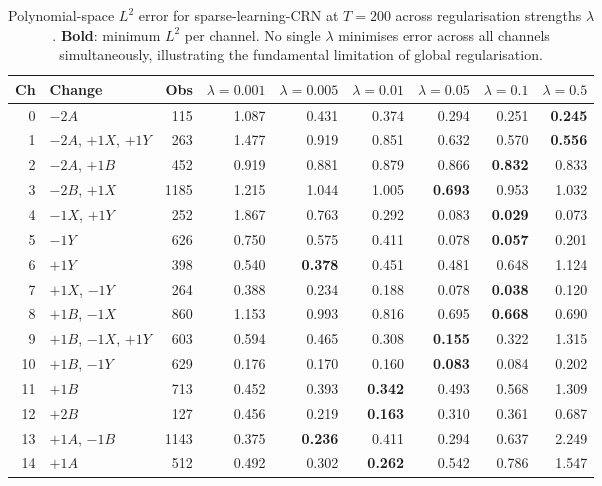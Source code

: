 \begin{table}[htbp]
\centering
\caption{%
  Polynomial-space $L^2$ error for sparse-learning-CRN at $T{=}200$
  across regularisation strengths $\lambda$.
  \textbf{Bold}: minimum $L^2$ per channel.
  No single $\lambda$ minimises error across all channels simultaneously,
  illustrating the fundamental limitation of global regularisation.
}
\label{tab:lasso-lambda-sweep}
\begin{tabular}{rlrrrrrrr}
\toprule
\textbf{Ch} & \textbf{Change} & \textbf{Obs} & $\lambda=0.001$ & $\lambda=0.005$ & $\lambda=0.01$ & $\lambda=0.05$ & $\lambda=0.1$ & $\lambda=0.5$ \\
\midrule
0 & $-2A$ & 115 & 1.087 & 0.431 & 0.374 & 0.294 & 0.251 & \textbf{0.245} \\
1 & $-2A$, $+1X$, $+1Y$ & 263 & 1.477 & 0.919 & 0.851 & 0.632 & 0.570 & \textbf{0.556} \\
2 & $-2A$, $+1B$ & 452 & 0.919 & 0.881 & 0.879 & 0.866 & \textbf{0.832} & 0.833 \\
3 & $-2B$, $+1X$ & 1185 & 1.215 & 1.044 & 1.005 & \textbf{0.693} & 0.953 & 1.032 \\
4 & $-1X$, $+1Y$ & 252 & 1.867 & 0.763 & 0.292 & 0.083 & \textbf{0.029} & 0.073 \\
5 & $-1Y$ & 626 & 0.750 & 0.575 & 0.411 & 0.078 & \textbf{0.057} & 0.201 \\
6 & $+1Y$ & 398 & 0.540 & \textbf{0.378} & 0.451 & 0.481 & 0.648 & 1.124 \\
7 & $+1X$, $-1Y$ & 264 & 0.388 & 0.234 & 0.188 & 0.078 & \textbf{0.038} & 0.120 \\
8 & $+1B$, $-1X$ & 860 & 1.153 & 0.993 & 0.816 & 0.695 & \textbf{0.668} & 0.690 \\
9 & $+1B$, $-1X$, $+1Y$ & 603 & 0.594 & 0.465 & 0.308 & \textbf{0.155} & 0.322 & 1.315 \\
10 & $+1B$, $-1Y$ & 629 & 0.176 & 0.170 & 0.160 & \textbf{0.083} & 0.084 & 0.202 \\
11 & $+1B$ & 713 & 0.452 & 0.393 & \textbf{0.342} & 0.493 & 0.568 & 1.309 \\
12 & $+2B$ & 127 & 0.456 & 0.219 & \textbf{0.163} & 0.310 & 0.361 & 0.687 \\
13 & $+1A$, $-1B$ & 1143 & 0.375 & \textbf{0.236} & 0.411 & 0.294 & 0.637 & 2.249 \\
14 & $+1A$ & 512 & 0.492 & 0.302 & \textbf{0.262} & 0.542 & 0.786 & 1.547 \\
\bottomrule
\end{tabular}
\end{table}